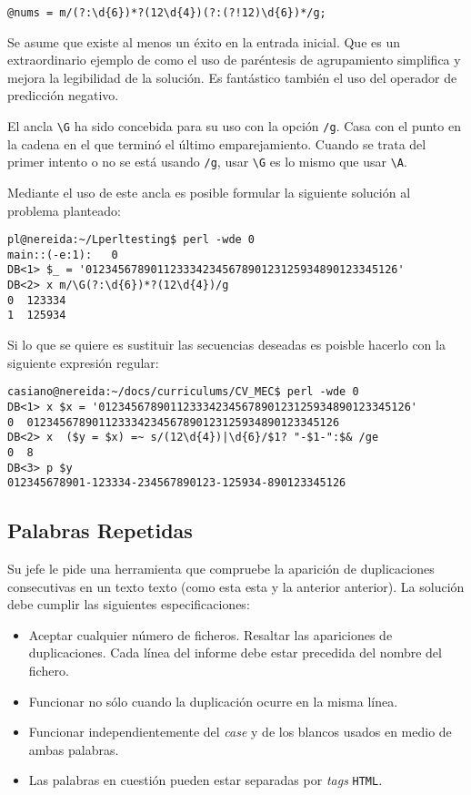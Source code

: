 \begin{center}
\begin{verbatim}
@nums = m/(?:\d{6})*?(12\d{4})(?:(?!12)\d{6})*/g;
\end{verbatim}
\end{center}

Se asume que existe al menos un éxito en la entrada inicial.
Que es un extraordinario ejemplo de como el uso de paréntesis de agrupamiento
simplifica y mejora la legibilidad de la solución. Es fantástico también el uso
del operador de predicción negativo.


El ancla \verb|\G| ha sido concebida para su uso con la opción \verb|/g|.
Casa con el punto en la cadena en el que terminó el último emparejamiento.
Cuando se trata del primer intento o no se está usando \verb|/g|, usar \verb|\G|
es lo mismo que usar \verb|\A|.

Mediante el uso de este ancla es posible formular la siguiente solución 
al problema planteado:

\begin{center}
\begin{verbatim}
pl@nereida:~/Lperltesting$ perl -wde 0
main::(-e:1):   0
DB<1> $_ = '012345678901123334234567890123125934890123345126'
DB<2> x m/\G(?:\d{6})*?(12\d{4})/g
0  123334
1  125934
\end{verbatim}
\end{center}



Si lo que se quiere es sustituir las secuencias deseadas es poisble hacerlo con 
la siguiente expresión regular:
\begin{verbatim}
casiano@nereida:~/docs/curriculums/CV_MEC$ perl -wde 0
DB<1> x $x = '012345678901123334234567890123125934890123345126'
0  012345678901123334234567890123125934890123345126
DB<2> x  ($y = $x) =~ s/(12\d{4})|\d{6}/$1? "-$1-":$& /ge
0  8
DB<3> p $y
012345678901-123334-234567890123-125934-890123345126
\end{verbatim}

\subsection{Palabras Repetidas}
\label{section:repetidas}
Su jefe le pide una herramienta que compruebe la aparición de
duplicaciones consecutivas en un texto texto (como esta esta y la anterior anterior).
La solución debe cumplir las siguientes especificaciones:
\begin{itemize}
\item
Aceptar cualquier número de ficheros. Resaltar las apariciones
de duplicaciones. Cada línea del informe debe estar precedida del nombre del fichero.
\item
Funcionar no sólo cuando la duplicación ocurre en la misma línea.
\item
Funcionar independientemente del \emph{case} y de los blancos usados en medio
de ambas palabras.
\item
Las palabras en cuestión pueden estar separadas por \emph{tags} \verb|HTML|.
\end{itemize}

